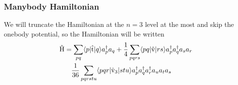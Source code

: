 \begin{frame}[fragile]
    \frametitle{Manybody Hamiltonian}

    We will truncate the Hamiltonian at the $n=3$ level at the most and skip the onebody potential, so the Hamiltonian will be written
    \begin{align*}
        \hat{\mathrm{H}} &= \sum_{p q} \langle p | \hat{\mathrm{t}} |q\rangle a_p^\dagger a_q +
        \frac{1}{4} \sum_{pqrs} \langle pq | \hat{\mathrm{v}} |rs\rangle  a_p^\dagger a_q^\dagger a_s a_r \notag \\
        & \quad \frac{1}{36} \sum_{pqrstu} \langle pqr | \hat{\mathrm{v}}_3 |stu\rangle
            a_p^\dagger a_q^\dagger a_r^\dagger a_u a_t a_s
    \end{align*}
\end{frame}
